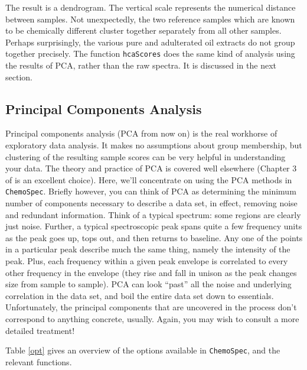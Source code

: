 \documentclass[letter,10pt,twocolumn,twoside,printwatermark=false]{pinp}
\begin{document}
The result is a dendrogram. The vertical scale represents the numerical
distance between samples. Not unexpectedly, the two reference samples
which are known to be chemically different cluster together separately
from all other samples. Perhaps surprisingly, the various pure and
adulterated oil extracts do not group together precisely. The function
\texttt{hcaScores} does the same kind of analysis using the results of
PCA, rather than the raw spectra. It is discussed in the next section.

\hypertarget{principal-components-analysis}{%
\subsection{Principal Components
Analysis}\label{principal-components-analysis}}

\label{sec-pca} Principal components analysis (PCA from now on) is the
real workhorse of exploratory data analysis. It makes no assumptions
about group membership, but clustering of the resulting sample scores
can be very helpful in understanding your data. The theory and practice
of PCA is covered well elsewhere (Chapter 3 of \cite{Filz} is an
excellent choice). Here, we'll concentrate on using the PCA methods in
\texttt{ChemoSpec}. Briefly however, you can think of PCA as determining
the minimum number of components necessary to describe a data set, in
effect, removing noise and redundant information. Think of a typical
spectrum: some regions are clearly just noise. Further, a typical
spectroscopic peak spans quite a few frequency units as the peak goes
up, tops out, and then returns to baseline. Any one of the points in a
particular peak describe much the same thing, namely the intensity of
the peak. Plus, each frequency within a given peak envelope is
correlated to every other frequency in the envelope (they rise and fall
in unison as the peak changes size from sample to sample). PCA can look
``past'' all the noise and underlying correlation in the data set, and
boil the entire data set down to essentials. Unfortunately, the
principal components that are uncovered in the process don't correspond
to anything concrete, usually. Again, you may wish to consult a more
detailed treatment!

Table \ref{opt} gives an overview of the options available in
\texttt{ChemoSpec}, and the relevant functions.
\end{document}
